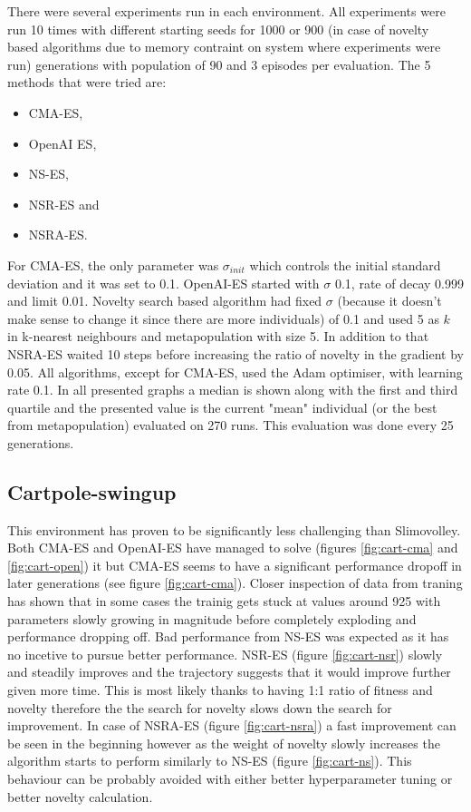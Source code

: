 There were several experiments run in each environment. All experiments were run 10 times with different starting seeds for 1000 or 900 (in case of novelty based algorithms due to memory contraint on system where experiments were run) generations with population of 90 and 3 episodes per evaluation. The 5 methods that were tried are:
\begin{itemize}
    \item CMA-ES,
    \item OpenAI ES,
    \item NS-ES,
    \item NSR-ES and
    \item NSRA-ES.
\end{itemize}

For CMA-ES, the only parameter was $\sigma_{init}$ which controls the initial standard deviation and it was set to 0.1. OpenAI-ES started with $\sigma$ 0.1, rate of decay 0.999 and limit 0.01. Novelty search based algorithm had fixed $\sigma$ (because it doesn't make sense to change it since there are more individuals) of 0.1 and used 5 as $k$ in k-nearest neighbours and metapopulation with size 5. In addition to that NSRA-ES waited 10 steps before increasing the ratio of novelty in the gradient by 0.05. All algorithms, except for CMA-ES, used the Adam \cite{kingma2017adam} optimiser, with learning rate 0.1. In all presented graphs a median is shown along with the first and third quartile and the presented value is the current "mean" individual (or the best from metapopulation) evaluated on 270 runs. This evaluation was done every 25 generations.


\subsection{Cartpole-swingup}

This environment has proven to be significantly less challenging than Slimovolley. Both CMA-ES and  OpenAI-ES have managed to solve (figures \ref{fig:cart-cma} and \ref{fig:cart-open}) it but CMA-ES seems to have a significant performance dropoff in later generations (see figure \ref{fig:cart-cma}). Closer inspection of data from traning has shown that in some cases the trainig gets stuck at values around 925 with parameters slowly growing in magnitude before completely exploding and performance dropping off. Bad performance from NS-ES was expected as it has no incetive to pursue better performance. NSR-ES (figure \ref{fig:cart-nsr}) slowly and steadily improves and the trajectory suggests that it would improve further given more time. This is most likely thanks to having 1:1 ratio of fitness and novelty therefore the the search for novelty slows down the search for improvement. In case of NSRA-ES (figure \ref{fig:cart-nsra}) a fast improvement can be seen in the beginning however as the weight of novelty slowly increases the algorithm starts to perform similarly to NS-ES (figure \ref{fig:cart-ns}). This behaviour can be probably avoided with either better hyperparameter tuning or better novelty calculation.


